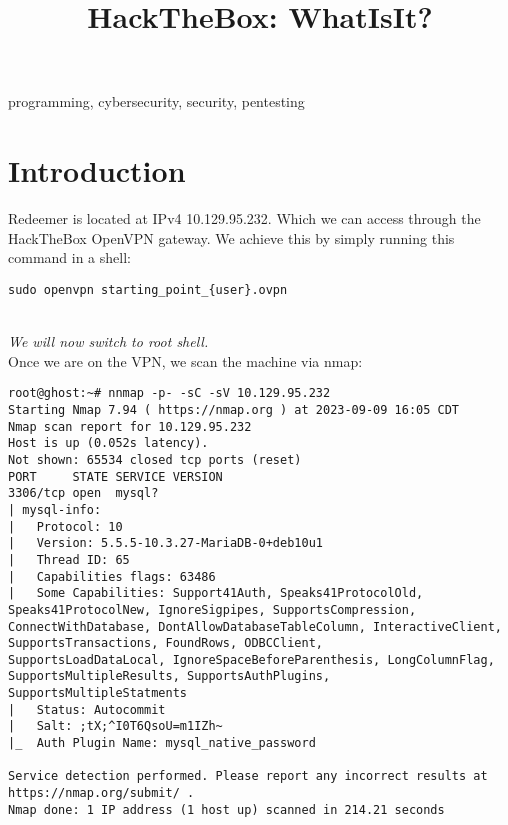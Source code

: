 \documentclass[conference]{IEEEtran}
\begin{document}
\onecolumn


\title{HackTheBox: WhatIsIt?}

\author{
}

\maketitle



\begin{abstract}

\end{abstract}



\begin{IEEEkeywords}
programming, cybersecurity, security, pentesting
\end{IEEEkeywords}


\section{Introduction}
Redeemer is located at IPv4 10.129.95.232. Which we can access through the HackTheBox OpenVPN gateway.
We achieve this by simply running this command in a shell:
\begin{scriptsize}
\begin{verbatim}
sudo openvpn starting_point_{user}.ovpn
\end{verbatim}
\end{scriptsize}

\\
\textit{We will now switch to root shell.}
\\

Once we are on the VPN, we scan the machine via nmap:
\begin{scriptsize}
\begin{verbatim}
root@ghost:~# nnmap -p- -sC -sV 10.129.95.232
Starting Nmap 7.94 ( https://nmap.org ) at 2023-09-09 16:05 CDT
Nmap scan report for 10.129.95.232
Host is up (0.052s latency).
Not shown: 65534 closed tcp ports (reset)
PORT     STATE SERVICE VERSION
3306/tcp open  mysql?
| mysql-info:
|   Protocol: 10
|   Version: 5.5.5-10.3.27-MariaDB-0+deb10u1
|   Thread ID: 65
|   Capabilities flags: 63486
|   Some Capabilities: Support41Auth, Speaks41ProtocolOld, Speaks41ProtocolNew, IgnoreSigpipes, SupportsCompression,
ConnectWithDatabase, DontAllowDatabaseTableColumn, InteractiveClient, SupportsTransactions, FoundRows, ODBCClient,
SupportsLoadDataLocal, IgnoreSpaceBeforeParenthesis, LongColumnFlag, SupportsMultipleResults, SupportsAuthPlugins,
SupportsMultipleStatments
|   Status: Autocommit
|   Salt: ;tX;^I0T6QsoU=m1IZh~
|_  Auth Plugin Name: mysql_native_password

Service detection performed. Please report any incorrect results at https://nmap.org/submit/ .
Nmap done: 1 IP address (1 host up) scanned in 214.21 seconds

\end{verbatim}
\end{scriptsize}
\end{document}
